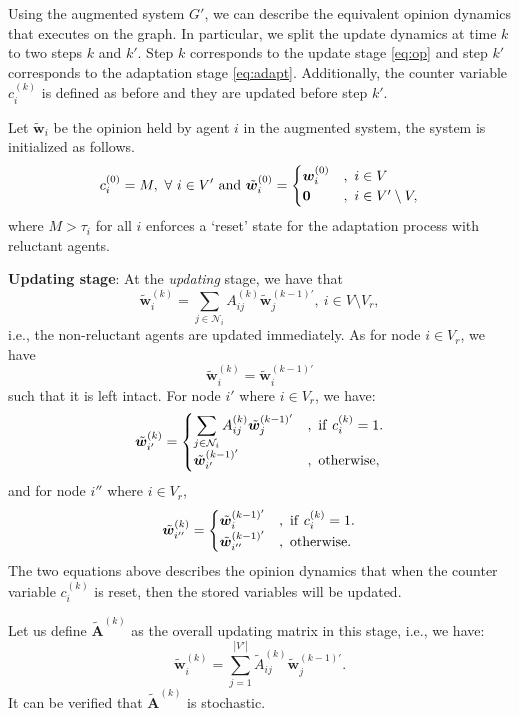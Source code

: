 \documentclass[letter]{article}
\theoremstyle{remark}
\begin{document}
Using the augmented system $G'$, we can describe the equivalent opinion dynamics that executes on the graph. In particular, we split the update dynamics at time $k$ to two steps $k$ and $k'$. Step $k$ corresponds to the update stage \eqref{eq:op} and step $k'$ corresponds to the adaptation stage \eqref{eq:adapt}. 
Additionally, the counter variable $c_i^{(k)}$ is defined as before and they are updated before step $k'$. 

Let $\tilde{ \bm w}_i$ be the opinion held by agent $i$ in the augmented system, the system is initialized as follows.
\[
c_i^{(0)} = M,~\forall~ i \in V'~{\rm and}~\tilde{ \bm w}_i^{(0)} = \begin{cases} { \bm w}_i^{(0)} &,~i \in V \\
 {\bf 0} &,~i \in V' \setminus V, \end{cases}
\]
where $M > \tau_i$ for all $i$ enforces a `reset' state for the adaptation process with reluctant agents. 

\textbf{Updating stage}: At the \emph{updating} stage, we have that 
\[
\tilde{\bm w}_i^{(k)} = \sum_{j \in \mathcal{N}_i} A_{ij}^{(k)} \tilde{\bm w}_j^{(k-1)'},~i \in V \setminus V_r,
\]
i.e., the non-reluctant agents are updated immediately. 
As for node $i \in V_r$, we have $$\tilde{\bm w}_i^{(k)} = \tilde{\bm w}_i^{(k-1)'}$$ such that it is left intact. 
For node $i'$ where $i \in V_r$, we have:
\[
\tilde{\bm w}_{i'}^{(k)} = \begin{cases}
\displaystyle \sum_{j \in \mathcal{N}_i} A_{ij}^{(k)} \tilde{\bm w}_j^{(k-1)'}&,~{\rm if}~c_i^{(k)} = 1. \\
\tilde{\bm w}_{i'}^{(k-1)'}&,~{\rm otherwise},
\end{cases}
\]
and for node $i''$ where $i \in V_r$, 
\[
\tilde{\bm w}_{i''}^{(k)} = \begin{cases}
\tilde{\bm w}_{i}^{(k-1)'}&,~{\rm if}~c_i^{(k)} = 1. \\
\tilde{\bm w}_{i''}^{(k-1)'}&,~{\rm otherwise}.
\end{cases}
\]
The two equations above describes the opinion dynamics that when the counter variable $c_i^{(k)}$ is reset, then the stored variables will be updated. 

Let us define $\tilde{\bm A}^{(k)}$ as the overall updating matrix in this stage, i.e., we have:
\[
\tilde{\bm w}_i^{(k)} = \sum_{j=1}^{|V'|} \tilde{A}_{ij}^{(k)} \tilde{\bm w}_j^{(k-1)'}.
\]
It can be verified that $\tilde{\bm A}^{(k)}$ is stochastic. 
\end{document}

